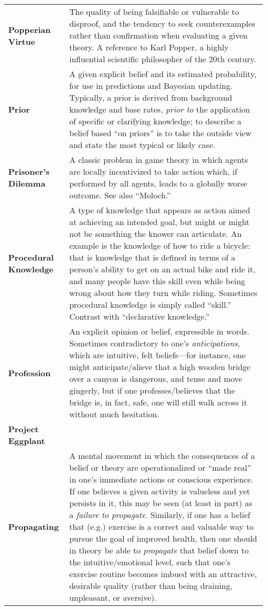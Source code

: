 \begin{longtable} { p{} p{} }
\textbf{Popperian Virtue} & The quality of being falsifiable or vulnerable to disproof, and the tendency to seek counterexamples rather than confirmation when evaluating a given theory.  A reference to Karl Popper, a highly influential scientific philosopher of the 20th century.\\

\textbf{Prior} & A given explicit belief and its estimated probability, for use in predictions and Bayesian updating.  Typically, a prior is derived from background knowledge and base rates, \emph{prior to} the application of specific or clarifying knowledge; to describe a belief based ``on priors'' is to take the outside view and state the most typical or likely case.\\

\textbf{Prisoner's Dilemma} & A classic problem in game theory in which agents are locally incentivized to take action which, if performed by all agents, leads to a globally worse outcome.  See also ``Moloch.''\\

\textbf{Procedural Knowledge} & A type of knowledge that appears as action aimed at achieving an intended goal, but might or might not be something the knower can articulate. An example is the knowledge of how to ride a bicycle: that is knowledge that is defined in terms of a person's ability to get on an actual bike and ride it, and many people have this skill even while being wrong about how they turn while riding. Sometimes procedural knowledge is simply called ``skill.'' Contrast with ``declarative knowledge.''\\

\textbf{Profession} & An explicit opinion or belief, expressible in words.  Sometimes contradictory to one's \emph{anticipations}, which are intuitive, felt beliefs---for instance, one might anticipate/alieve that a high wooden bridge over a canyon is dangerous, and tense and move gingerly, but if one professes/believes that the bridge is, in fact, safe, one will still walk across it without much hesitation.\\

\textbf{Project Eggplant} & \\

\textbf{Propagating} & A mental movement in which the consequences of a belief or theory are operationalized or ``made real'' in one's immediate actions or conscious experience.  If one believes a given activity is valueless and yet persists in it, this may be seen (at least in part) as a \emph{failure to propagate}.  Similarly, if one has a belief that (e.g.) exercise is a correct and valuable way to pursue the goal of improved health, then one should in theory be able to \emph{propagate} that belief down to the intuitive/emotional level, such that one's exercise routine becomes imbued with an attractive, desirable quality (rather than being draining, unpleasant, or aversive).\\


\end{longtable}
